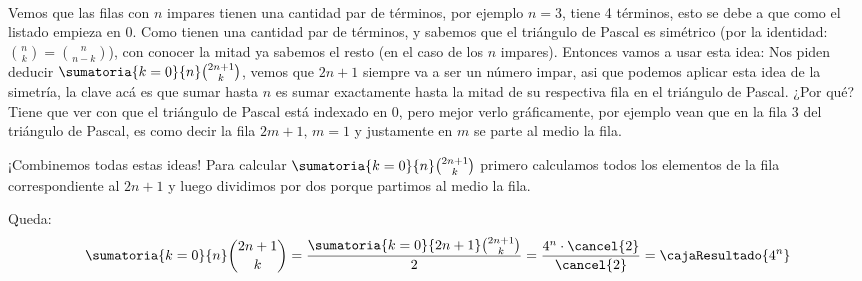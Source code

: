 \begin{enumerate}[label=\alph*)]
$$\begin{array}{c|ccccccccccc}
          \end{array}
        $$
        Vemos que las filas con $n$ impares tienen una cantidad par de términos, por ejemplo $n = 3$, tiene 4 términos, esto se debe a que como el listado empieza
        en $0$. Como tienen una cantidad par de términos, y sabemos que el triángulo de Pascal es simétrico
        (por la identidad: $\binom{n}{k} = \binom{n}{n - k}$), con
        conocer la mitad ya sabemos el resto (en el caso de los $n$ impares). Entonces vamos a usar esta idea:
        Nos piden deducir $\sumatoria{k = 0}{n} \binom{2n + 1}{k}$, vemos
        que $2n + 1$ siempre va a ser un número impar, asi que podemos aplicar esta idea de la simetría, la clave acá es que sumar hasta $n$ es sumar exactamente
        hasta la mitad de su respectiva fila en el triángulo de Pascal. ¿Por qué? Tiene que ver con que el triángulo de Pascal está indexado en 0, pero mejor
        verlo gráficamente, por ejemplo vean que en la fila 3 del triángulo de Pascal, es como decir la fila $2m + 1,\, m=1$ y justamente en $m$ se parte al medio
        la fila.

        ¡Combinemos todas estas ideas! Para calcular $\sumatoria{k = 0}{n} \binom{2n + 1}{k}$ primero calculamos todos los elementos de la fila correspondiente
        al $2n + 1$ y luego dividimos por dos porque partimos al medio la fila.

        Queda:
        $$
          \sumatoria{k = 0}{n} \binom{2n + 1}{k} =
          \frac{\sumatoria{k = 0}{2n + 1} \binom{2n + 1}{k}}{2} = \frac{4^n \cdot \cancel{2}}{\cancel{2}} = \cajaResultado{4^n}
        $$

\end{enumerate}
{\small
\begin{aportes}[3]
  \item {}
  \item {}
  \item {}
  \item {}
  \item {}
\end{aportes}
}
